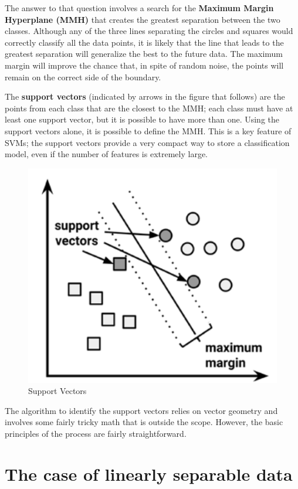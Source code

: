 \documentclass[
]{article}
\begin{document}
The answer to that question involves a search for the \textbf{Maximum
Margin Hyperplane (MMH)} that creates the greatest separation between
the two classes. Although any of the three lines separating the circles
and squares would correctly classify all the data points, it is likely
that the line that leads to the greatest separation will generalize the
best to the future data. The maximum margin will improve the chance
that, in spite of random noise, the points will remain on the correct
side of the boundary.

The \textbf{support vectors} (indicated by arrows in the figure that
follows) are the points from each class that are the closest to the MMH;
each class must have at least one support vector, but it is possible to
have more than one. Using the support vectors alone, it is possible to
define the MMH. This is a key feature of SVMs; the support vectors
provide a very compact way to store a classification model, even if the
number of features is extremely large.

\begin{figure}

{\centering \includegraphics[width=0.5\linewidth,]{images/suportvectors} 

}

\caption{Support Vectors}\label{fig:fig3}
\end{figure}

The algorithm to identify the support vectors relies on vector geometry
and involves some fairly tricky math that is outside the scope. However,
the basic principles of the process are fairly straightforward.

\hypertarget{the-case-of-linearly-separable-data}{%
\section{The case of linearly separable
data}\label{the-case-of-linearly-separable-data}}
\end{document}

